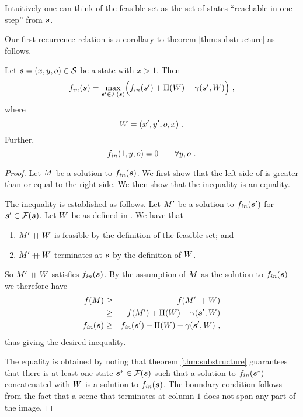 Intuitively one can think of the feasible set as the set of states
``reachable in one step'' from $\State$.

Our first recurrence relation is a corollary to theorem
\ref{thm:substructure} as follows.
\begin{corollary}
  \label{cor:first-recurrence}
  Let $\State=(x,y,\WallOrient)\in\StateSpace$ be a state with
  $x>1$. Then
  \begin{equation}
    \label{eq:first-recurrence}
    \SubProbIN(\State) = 
    \max_{\State'\in\FeasibleSet(\State)}\limits
    \Bigl( 
      \SubProbIN(\State') + \WallPayoff(\Wall) - \CornerPenalty(\State',\Wall)
    \Bigr) ~,
  \end{equation}
  where
  \begin{equation}
    \label{eq:wall-def2}
    \Wall=(x',y',\WallOrient,x) ~.
  \end{equation}
  Further,
  \begin{equation}
    \label{eq:first-boundary}
    \SubProbIN(1,y,\WallOrient) = 0 \quad\quad \forall y,\WallOrient ~.
  \end{equation}
\end{corollary}
\begin{proof}
  Let $\Scene$ be a solution to $\SubProbIN(\State)$. We first show
  that the left side of  is greater than or
  equal to the right side. We then show that the inequality is an
  equality.

  The inequality is established as follows. Let $\Scene'$ be a
  solution to $\SubProbIN(\State')$ for
  $\State'\in\FeasibleSet(\State)$. Let $\Wall$ be as defined in
  . We have that
  \begin{enumerate}
    \item{$\Scene'\concat\Wall$ is feasible by the definition of the
      feasible set; and}
    \item{$\Scene'\concat\Wall$ terminates at $\State$ by the definition
      of $\Wall$.}
  \end{enumerate}
  So $\Scene'\concat\Wall$ satisfies $\SubProbIN(\State)$. By the
  assumption of $\Scene$ as the solution to $\SubProbIN(\State)$ we
  therefore have
  \begin{eqnarray}
    \Objective(\Scene)
      &\geq&
    \Objective(\Scene'\concat\Wall)\\
      &\geq&
    \Objective(\Scene') + \WallPayoff(\Wall) -
    \CornerPenalty(\State',\Wall)\\
    \SubProbIN(\State)
      &\geq&
    \SubProbIN(\State') + \WallPayoff(\Wall) -
    \CornerPenalty(\State',\Wall) ~,
  \end{eqnarray}
  thus giving the desired inequality.

  The equality is obtained by noting that theorem
  \ref{thm:substructure} guarantees that there is at least one state
  $\State^*\in\FeasibleSet(\State)$ such that a solution to
  $\SubProbIN(\State^*)$ concatenated with $\Wall$ is a solution to
  $\SubProbIN(\State)$. The boundary condition
   follows from the fact that a scene that
  terminates at column $1$ does not span any part of the image.
\end{proof}

